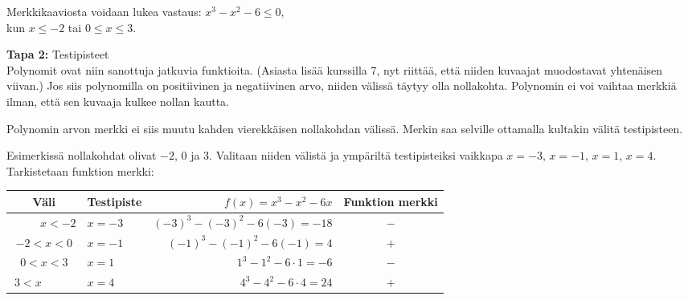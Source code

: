 \begin{center}
\begin{merkkikaavio}{3}

	\merkkikaavioMerkki{$-$}
	\merkkikaavioMerkki{$+$}
	\merkkikaavioMerkki{$+$}
	\merkkikaavioMerkki{$+$}

\merkkikaavioUusirivi
	\merkkikaavioMerkki{$-$}
	\merkkikaavioMerkki{$-$}
	\merkkikaavioMerkki{$-$}
	\merkkikaavioMerkki{$+$}

\merkkikaavioUusirivi
	\merkkikaavioMerkki{$-$}
	\merkkikaavioMerkki{$-$}
	\merkkikaavioMerkki{$+$}
	\merkkikaavioMerkki{$+$}

\merkkikaavioUusiriviKaksoisviiva
	\merkkikaavioMerkki{$-$}
	\merkkikaavioMerkki{$+$}
	\merkkikaavioMerkki{$-$}
	\merkkikaavioMerkki{$+$}
\end{merkkikaavio}
\end{center}

Merkkikaaviosta voidaan lukea vastaus: $x^3-x^2 -6 \leq 0$, \\ kun
$x\leq -2$ tai $0\leq x \leq 3$.

\textbf{Tapa 2:} Testipisteet\\
Polynomit ovat niin sanottuja jatkuvia funktioita. (Asiasta lisää kurssilla 7, nyt
riittää, että niiden kuvaajat muodostavat yhtenäisen viivan.) Jos siis polynomilla on positiivinen ja negatiivinen arvo, niiden välissä täytyy olla nollakohta. Polynomin ei voi vaihtaa merkkiä ilman, että sen kuvaaja kulkee nollan kautta.

Polynomin arvon merkki ei siis muutu kahden vierekkäisen nollakohdan välissä. Merkin saa selville ottamalla kultakin välitä testipisteen.

Esimerkissä nollakohdat olivat $-2$, $0$ ja $3$. Valitaan niiden välistä ja
ympäriltä testipisteiksi vaikkapa $x=-3$, $x=-1$, $x=1$, $x=4$. Tarkistetaan funktion merkki:

\begin{tabular}{c|l|r|c}
Väli & Testipiste & $f(x)=x^3-x^2-6x$ & Funktion merkki \\
\hline
\ \ \ \ \  $x < -2$ & $x = -3$ & $(-3)^3 -(-3)^2 - 6(-3) = -18$ & $-$ \\
$-2 <x < 0$ & $x = -1$ & $(-1)^3 -(-1)^2 - 6(-1) =4$ & $+$ \\
$0 <x < 3$ & $x = 1$ & $1^3 -1^2 - 6\cdot 1 =  -6$ & $-$ \\
$3 <x $ \ \ \ \ \ & $x = 4$ & $4^3 -4^2 - 6\cdot 4 = 24$ & $+$
\end{tabular}

